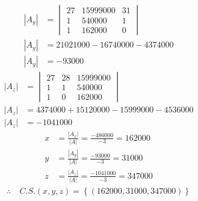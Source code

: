 \documentclass[10pt, a4paper]{article}
\begin{document}
\begin{align*}
  \left|A_y\right| &= \begin{vmatrix}
    27 & 15999000 & 31\\
    1 & 540000 & 1\\
    1 & 162000 & 0
  \end{vmatrix}\\
  \left|A_y\right| &= 21021000 - 16740000 - 4374000\\
  \left|A_y\right| &= -93000
\end{align*}
\begin{align*}
  \left|A_z\right| &= \begin{vmatrix}
    27 & 28 & 15999000\\
    1 & 1 & 540000\\
    1 & 0 & 162000
  \end{vmatrix}\\
  \left|A_z\right| &= 4374000 + 15120000 - 15999000 - 4536000\\
  \left|A_z\right| &= -1041000
\end{align*}
\begin{align*}
  x &= \frac{\left|A_x\right|}{\left|A\right|} = \frac{-486000}{-3} = 162000\\
  y &= \frac{\left|A_y\right|}{\left|A\right|} = \frac{-93000}{-3} = 31000\\
  z &= \frac{\left|A_z\right|}{\left|A\right|} = \frac{-1041000}{-3} = 347000
\end{align*}
\begin{align*}
  \therefore \ &C.S. \left(x,y,z\right) = \left\{\left(162000,31000,347000\right)\right\}
\end{align*}
\begin{center}
\end{center}
\newpage
\end{document}
